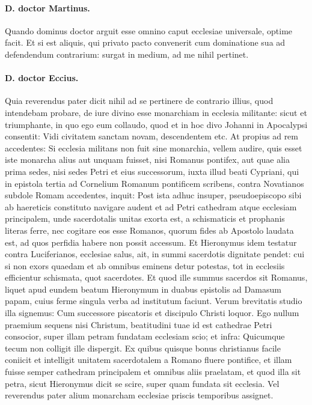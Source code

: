 \paragraph*{D. doctor Martinus.}

Quando dominus doctor arguit esse omnino caput ecclesiae universale, optime facit. Et si est aliquis, qui privato pacto convenerit cum dominatione sua ad defendendum contrarium: surgat in medium, ad me nihil pertinet.

\paragraph*{D. doctor Eccius.}

Quia reverendus pater dicit nihil ad se pertinere de contrario illius, quod intendebam probare, de iure divino esse monarchiam in ecclesia militante: sicut et triumphante, in quo ego eum collaudo, quod et in hoc divo Johanni in Apocalypsi consentit: Vidi civitatem sanctam novam, descendentem etc. At propius ad rem accedentes: Si ecclesia militans non fuit sine monarchia, vellem audire, quis esset iste monarcha alius aut unquam fuisset, nisi Romanus pontifex, aut quae alia prima sedes, nisi sedes Petri et eius successorum, iuxta illud beati Cypriani, qui in epistola tertia ad Cornelium Romanum pontificem scribens, contra Novatianos subdole Romam accedentes, inquit: Post ista adhuc insuper, pseudoepiscopo sibi ab haereticis constituto navigare audent et ad Petri cathedram atque ecclesiam principalem, unde sacerdotalis unitas exorta est, a schismaticis et prophanis literas ferre, nec cogitare eos esse Romanos, quorum fides ab Apostolo laudata est, ad quos perfidia habere non possit accessum. Et Hieronymus idem testatur contra Luciferianos, ecclesiae salus, ait, in summi sacerdotis dignitate pendet: cui si non exors quaedam et ab omnibus eminens detur potestas, tot in ecclesiis efficientur schismata, quot sacerdotes. Et quod ille summus sacerdos sit Romanus, liquet apud eundem beatum Hieronymum in duabus epistolis ad Damasum papam, cuius ferme singula verba ad institutum faciunt. Verum brevitatis studio illa signemus: Cum successore piscatoris et discipulo Christi loquor. Ego nullum praemium sequens nisi Christum, beatitudini tuae id est cathedrae \marginpar{\small[257]} Petri consocior, super illam petram fundatam ecclesiam scio; et infra: Quicumque tecum non colligit ille dispergit. Ex quibus quisque bonus christianus facile coniicit et intelligit unitatem sacerdotalem a Romano fluere pontifice, et illam fuisse semper cathedram principalem et omnibus aliis praelatam, et quod illa sit petra, sicut Hieronymus dicit se scire, super quam fundata sit ecclesia. Vel reverendus pater alium monarcham ecclesiae priscis temporibus assignet.

